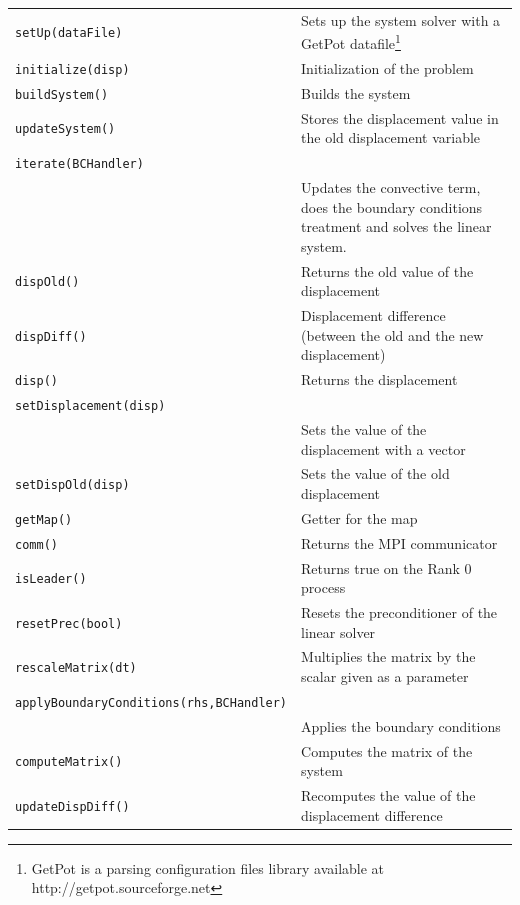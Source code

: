 \documentclass[11pt]{article}
\begin{document}
\begin{center}
\begin{longtable}{p{3cm}p{7cm}}
	\hline
	\texttt{setUp(dataFile)} & Sets up the system solver with a GetPot datafile\footnote{GetPot is a parsing configuration files library available at http://getpot.sourceforge.net}\\
	\texttt{initialize(disp)} & Initialization of the problem\\
	\texttt{buildSystem()} & Builds the system\\
	\texttt{updateSystem()} & Stores the displacement value in the old displacement variable\\
	\texttt{iterate(BCHandler)} \\
	& Updates the convective term, does the boundary conditions treatment and solves the linear system.\\
	\texttt{dispOld()} & Returns the old value of the displacement\\
	\texttt{dispDiff()} & Displacement difference (between the old and the new displacement)\\
	\texttt{disp()} & Returns the displacement\\
	\texttt{setDisplacement(disp)} \\
	& Sets the value of the displacement with a vector\\
	\texttt{setDispOld(disp)} & Sets the value of the old displacement\\
	\texttt{getMap()} & Getter for the map\\
	\texttt{comm()} & Returns the MPI communicator\\
	\texttt{isLeader()} & Returns true on the Rank 0 process\\
	\texttt{resetPrec(bool)} & Resets the preconditioner of the linear solver\\
	\texttt{rescaleMatrix(dt)} & Multiplies the matrix by the scalar given as a parameter\\
	\texttt{applyBoundaryConditions(rhs,BCHandler)} \\
	& Applies the boundary conditions\\
	\texttt{computeMatrix()} & Computes the matrix of the system\\
	\texttt{updateDispDiff()} & Recomputes the value of the displacement difference\\
	\hline
\end{longtable}
\end{center}
\end{document}
